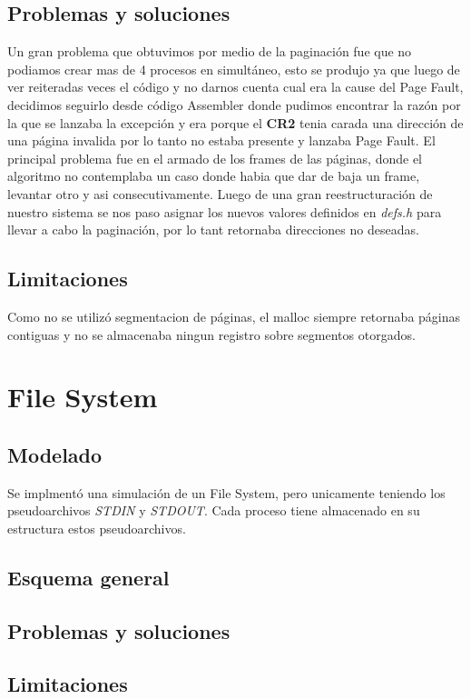 \documentclass[10pt,a4paper]{article}
\begin{document}
	\subsection{Problemas y soluciones}
		Un gran problema que obtuvimos por medio de la paginaci\'on fue que no podiamos crear mas de 4 procesos en simult\'aneo, esto se produjo ya que luego de ver reiteradas veces el c\'odigo y no darnos cuenta cual era la cause del Page Fault, decidimos seguirlo desde c\'odigo Assembler donde pudimos encontrar la raz\'on por la que se lanzaba la excepci\'on y era porque el \textbf{CR2} tenia carada una direcci\'on de una p\'agina invalida por lo tanto no estaba presente y lanzaba Page Fault. El principal problema fue en el armado de los frames de las p\'aginas, donde el algoritmo no contemplaba un caso donde habia que dar de baja un frame, levantar otro y asi consecutivamente. Luego de una gran reestructuraci\'on de nuestro sistema se nos paso asignar los nuevos valores definidos en \textit{defs.h} para llevar a cabo la paginaci\'on, por lo tant retornaba direcciones no deseadas.
	\subsection{Limitaciones}
		Como no se utiliz\'o segmentacion de p\'aginas, el malloc siempre retornaba p\'aginas contiguas y no se almacenaba ningun registro sobre segmentos otorgados.

\section{File System} 
	\subsection{Modelado}
		Se implment\'o una simulaci\'on de un File System, pero unicamente teniendo los pseudoarchivos \textit{STDIN} y \textit{STDOUT}. Cada proceso tiene almacenado en su estructura estos pseudoarchivos.
	\subsection{Esquema general}
	\subsection{Problemas y soluciones}
	\subsection{Limitaciones}
\end{document}
